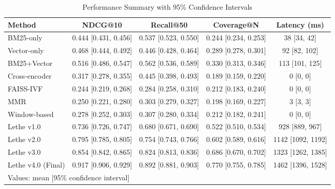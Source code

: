 \begin{table*}[htbp]
\centering
\caption{Performance Summary with 95\% Confidence Intervals}
\label{tab:performance-summary}
\begin{tabular}{lcccc}
\toprule
Method & NDCG@10 & Recall@50 & Coverage@N & Latency (ms) \\
\midrule
BM25-only & 0.444 [0.431, 0.456] & 0.537 [0.523, 0.550] & 0.244 [0.234, 0.253] & 38 [34, 42] \\
Vector-only & 0.468 [0.444, 0.492] & 0.446 [0.428, 0.464] & 0.289 [0.278, 0.301] & 92 [82, 102] \\
BM25+Vector & 0.516 [0.486, 0.547] & 0.562 [0.536, 0.589] & 0.330 [0.313, 0.346] & 113 [101, 125] \\
Cross-encoder & 0.317 [0.278, 0.355] & 0.445 [0.398, 0.493] & 0.189 [0.159, 0.220] & 0 [0, 0] \\
FAISS-IVF & 0.244 [0.219, 0.268] & 0.284 [0.258, 0.310] & 0.212 [0.183, 0.240] & 0 [0, 0] \\
MMR & 0.250 [0.221, 0.280] & 0.303 [0.279, 0.327] & 0.198 [0.169, 0.227] & 3 [3, 3] \\
Window-based & 0.278 [0.252, 0.303] & 0.307 [0.280, 0.334] & 0.212 [0.182, 0.241] & 0 [0, 0] \\
\midrule
Lethe v1.0 & 0.736 [0.726, 0.747] & 0.680 [0.671, 0.690] & 0.522 [0.510, 0.534] & 928 [889, 967] \\
Lethe v2.0 & 0.795 [0.785, 0.805] & 0.754 [0.743, 0.766] & 0.602 [0.589, 0.616] & 1142 [1092, 1192] \\
Lethe v3.0 & 0.854 [0.842, 0.865] & 0.824 [0.813, 0.836] & 0.686 [0.670, 0.702] & 1323 [1262, 1385] \\
Lethe v4.0 (Final) & 0.917 [0.906, 0.929] & 0.892 [0.881, 0.903] & 0.770 [0.755, 0.785] & 1462 [1396, 1528] \\
\bottomrule
\multicolumn{5}{l}{\small Values: mean [95\% confidence interval]} \\
\end{tabular}
\end{table*}
